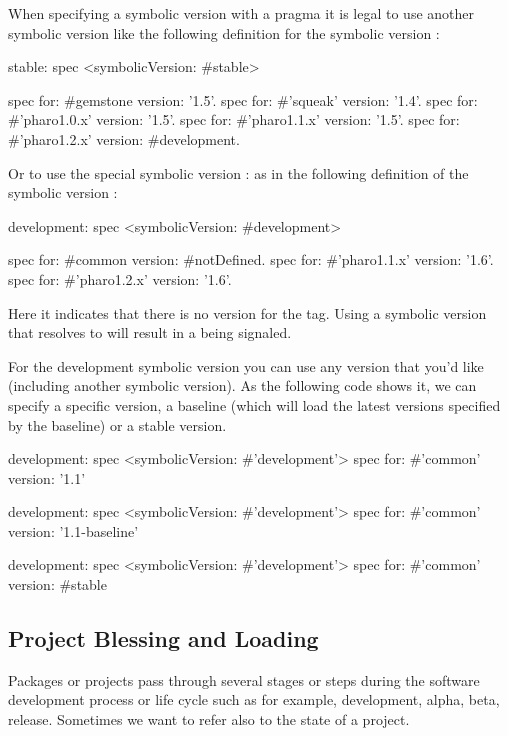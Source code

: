 \documentclass[a4paper,10pt,twoside]{book}
\begin{document}
When specifying a symbolic version with a  pragma it is legal to use another symbolic version like the following definition for the symbolic version :

\begin{code}{}
stable: spec
       <symbolicVersion: #stable>

       spec for: #gemstone version: '1.5'.
       spec for: #'squeak' version: '1.4'.
       spec for: #'pharo1.0.x' version: '1.5'.
       spec for: #'pharo1.1.x' version: '1.5'.
       spec for: #'pharo1.2.x' version: #development.
\end{code}

Or to use the special symbolic version : as in the following definition of the symbolic version :

\begin{code}{}
development: spec
       <symbolicVersion: #development>

       spec for: #common version: #notDefined.
       spec for: #'pharo1.1.x' version: '1.6'.
       spec for: #'pharo1.2.x' version: '1.6'.
\end{code}

Here it indicates that there is no version for the  tag. 
Using a symbolic version that resolves to  will result in a  being signaled.



For the development symbolic version you can use any version that you'd like (including another symbolic version). As the following code shows it, we can specify a specific version, a baseline (which will load the latest versions specified by the baseline) or a stable version.

\begin{code}{}
development: spec
       <symbolicVersion: #'development'>
       spec for: #'common' version: '1.1'

development: spec
       <symbolicVersion: #'development'>
       spec for: #'common' version: '1.1-baseline'

development: spec
       <symbolicVersion: #'development'>
       spec for: #'common' version: #stable
\end{code}



\subsection{Project Blessing and Loading}
Packages or projects pass through several stages or steps during the software development process or life cycle such as for example, development, alpha, beta, release. Sometimes we want to refer also to the state of a project.
\end{document}
